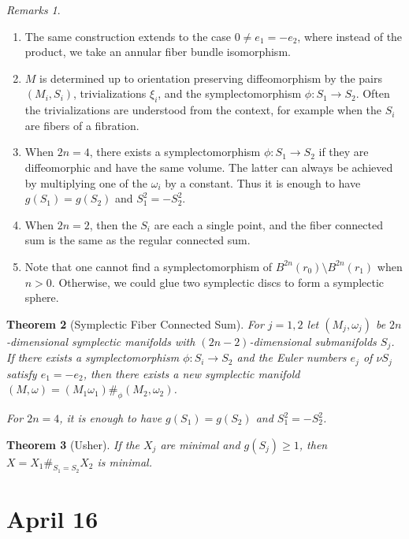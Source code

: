 \documentclass[leqno, openany]{memoir}
\newtheorem{thm}{Theorem}[chapter]
\theoremstyle{definition}
\theoremstyle{remark}
\newtheorem{rmks}[thm]{Remarks}
\theoremstyle{plain}
\theoremstyle{definition}
\theoremstyle{remark}
\begin{document}
    \begin{rmks}
        \begin{enumerate}
            \item The same construction extends to the case $0 \neq e_1 = -e_2$, where instead of the product, we take an annular fiber bundle isomorphism. 
            \item $M$ is determined up to orientation preserving diffeomorphism by the pairs $(M_i, S_i)$, trivializations $\xi_i$, and the symplectomorphism $\phi: S_1 \to S_2$. Often the trivializations are understood from the context, for example when the $S_i$ are fibers of a fibration.
            \item When $2n = 4$, there exists a symplectomorphism $\phi: S_1 \to S_2$ if they are diffeomorphic and have the same volume. The latter can always be achieved by multiplying one of the $\omega_i$ by a constant. Thus it is enough to have $g(S_1) = g(S_2)$ and $S_1^2 = -S_2^2$. 
            \item When $2n = 2$, then the $S_i$ are each a single point, and the fiber connected sum is the same as the regular connected sum.
            \item Note that one cannot find a symplectomorphism of $B^{2n}(r_0) \setminus B^{2n}(r_1)$ when $n > 0$. Otherwise, we could glue two symplectic discs to form a symplectic sphere.
        \end{enumerate}
    \end{rmks}

    \begin{thm}[Symplectic Fiber Connected Sum]
        For $j = 1,2$ let $(M_j, \omega_j)$ be $2n$-dimensional symplectic manifolds with $(2n-2)$-dimensional submanifolds $S_j$. If there exists a symplectomorphism $\phi: S_i \to S_2$ and the Euler numbers $e_j$ of $\nu S_j$ satisfy $e_1 = -e_2$, then there exists a new symplectic manifold $(M, \omega) = (M_1 \omega_1) \#_{\phi} (M_2, \omega_2)$.

        For $2n = 4$, it is enough to have $g(S_1) = g(S_2)$ and $S_1^2 = -S_2^2$.
    \end{thm}

    \begin{thm}[Usher]
        If the $X_j$ are minimal and $g(S_j) \geq 1$, then $X = X_1 \#_{S_1 = S_2} X_2$ is minimal.
    \end{thm}

    \chapter{April 16}%
    \label{cha:april_16}
    
\end{document}
